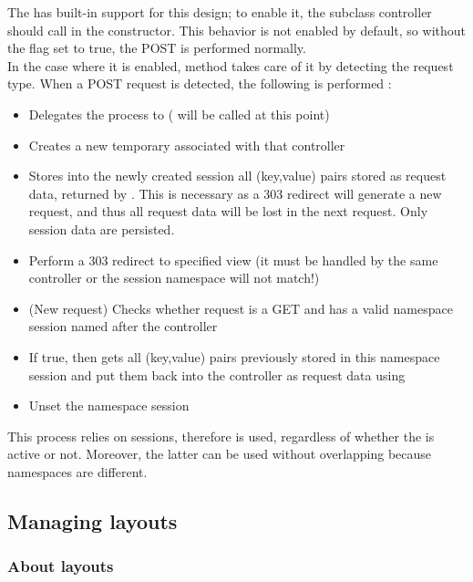 \documentclass[pdftex,12pt,a4paper]{article}
\begin{document}
The  has built-in support for this design; to enable it, the subclass controller should call  in the constructor. This behavior is not enabled by default, so without the flag set to true, the POST is performed normally. \\
In the case where it is enabled,  method takes care of it by detecting the request type. When a POST request is detected, the following is performed :
\begin{itemize}
	\item Delegates the process to  ( will be called at this point)
	\item Creates a new temporary  associated with that controller
	\item Stores into the newly created session all (key,value) pairs stored as request data, returned by . This is necessary as a 303 redirect will generate a new request, and thus all request data will be lost in the next request. Only session data are persisted.
	\item Perform a 303 redirect to specified view (it must be handled by the same controller or the session namespace will not match!)
	\item (New request) Checks whether request is a GET and has a valid namespace session named after the controller
	\item If true, then gets all (key,value) pairs previously stored in this namespace session and put them back into the controller as request data using 
	\item Unset the namespace session
\end{itemize}
\begin{note}
This process relies on sessions, therefore  is used, regardless of whether the  is active or not. Moreover, the latter can be used without overlapping because namespaces are different.
\end{note}


\subsection{Managing layouts} \label{sec:managing-layouts}

\subsubsection{About layouts} \label{sec:about-templates}
\end{document}
